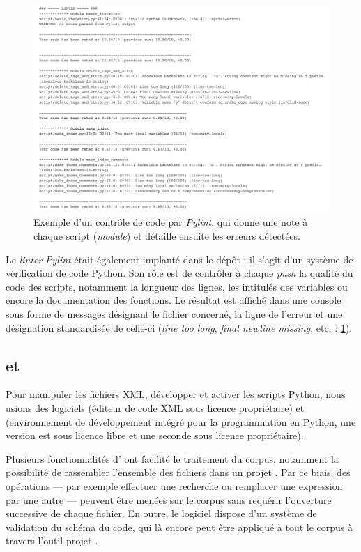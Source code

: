 \begin{figure}
    \centering
    \includegraphics[width=15cm]{img/pylint_output.png}
    \caption[Exemple d'un contrôle de code par \textit{Pylint}]{Exemple d'un contrôle de code par \textit{Pylint}, qui donne une note à chaque script (\textit{module}) et détaille ensuite les erreurs détectées.}
    \label{fig:pylint}
\end{figure}

Le \textit{linter} \textit{Pylint} était également implanté dans le dépôt ; il s'agit d'un système de vérification de code Python. Son rôle est de contrôler à chaque \textit{push} la qualité du code des scripts, notamment la longueur des lignes, les intitulés des variables ou encore la documentation des fonctions. Le résultat est affiché dans une console sous forme de messages désignant le fichier concerné, la ligne de l'erreur et une désignation standardisée de celle-ci (\textit{line too long}, \textit{final newline missing}, etc. : \fig{} \ref{fig:pylint}).

\subsection{\pycharm{} et \oxygen}

Pour manipuler les fichiers XML, développer et activer les scripts Python, nous usions des logiciels \oxygen{} (éditeur de code XML sous licence propriétaire) et \pycharm{} (environnement de développement intégré pour la programmation en Python, une version est sous licence libre et une seconde sous licence propriétaire). 

Plusieurs fonctionnalités d'\oxygen{} ont facilité le traitement du corpus, notamment la possibilité de rassembler l'ensemble des fichiers dans un \og projet \fg. Par ce biais, des opérations --- par exemple effectuer une recherche ou remplacer une expression par une autre --- peuvent être menées sur le corpus sans requérir l'ouverture successive de chaque fichier. En outre, le logiciel dispose d'un système de validation du schéma du code, qui là encore peut être appliqué à tout le corpus à travers l'outil \og projet \fg.

